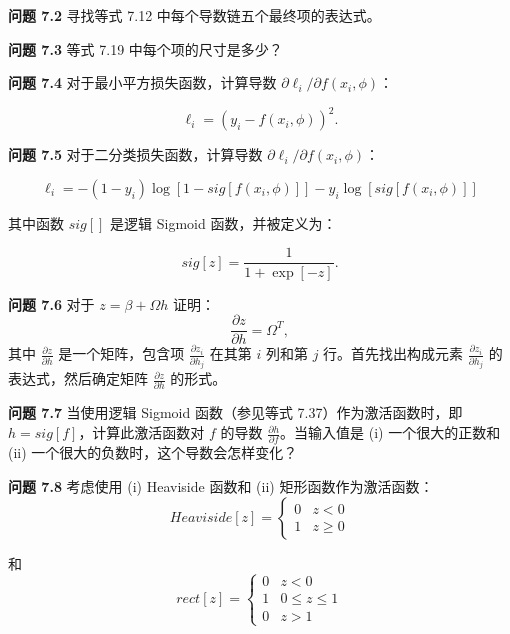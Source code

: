 \textbf{问题 7.2} 寻找等式 7.12 中每个导数链五个最终项的表达式。

\textbf{问题 7.3} 等式 7.19 中每个项的尺寸是多少？

\textbf{问题 7.4} 对于最小平方损失函数，计算导数 \(\partial\ell_i/\partial f(x_i, \phi)\)：

\begin{equation}
\ell_i = (y_i - f(x_i, \phi))^2. 
\end{equation}

\textbf{问题 7.5} 对于二分类损失函数，计算导数 \(\partial\ell_i/\partial f(x_i, \phi)\)：

\begin{equation}
\ell_i = -(1 - y_i)\log [ 1 - sig[f(x_i, \phi)] ] - y_i \log [sig[f(x_i, \phi)] ] 
\end{equation}

其中函数 \(sig[]\) 是逻辑 Sigmoid 函数，并被定义为：

\begin{equation}
sig[z] = \frac{1}{1 + \exp[-z]}. 
\end{equation}


\textbf{问题 7.6} 对于 \(z = \beta + \Omega h\) 证明：
\begin{equation*}
\frac{\partial z}{\partial h} = \Omega^T,
\end{equation*}
其中 \(\frac{\partial z}{\partial h}\) 是一个矩阵，包含项 \(\frac{\partial z_i}{\partial h_j}\) 在其第 \(i\) 列和第 \(j\) 行。首先找出构成元素 \(\frac{\partial z_i}{\partial h_j}\) 的表达式，然后确定矩阵 \(\frac{\partial z}{\partial h}\) 的形式。

\textbf{问题 7.7} 当使用逻辑 Sigmoid 函数（参见等式 7.37）作为激活函数时，即 \(h = sig[f]\)，计算此激活函数对 \(f\) 的导数 \(\frac{\partial h}{\partial f}\)。当输入值是 (i) 一个很大的正数和 (ii) 一个很大的负数时，这个导数会怎样变化？

\textbf{问题 7.8} 考虑使用 (i) Heaviside 函数和 (ii) 矩形函数作为激活函数：
\begin{equation}
Heaviside[z] = \begin{cases}
0 & z < 0 \\
1 & z \geq 0
\end{cases} 
\end{equation}

和
\begin{equation}
rect[z] = \begin{cases}
0 & z < 0 \\
1 & 0 \leq z \leq 1 \\
0 & z > 1
\end{cases} 
\end{equation}

